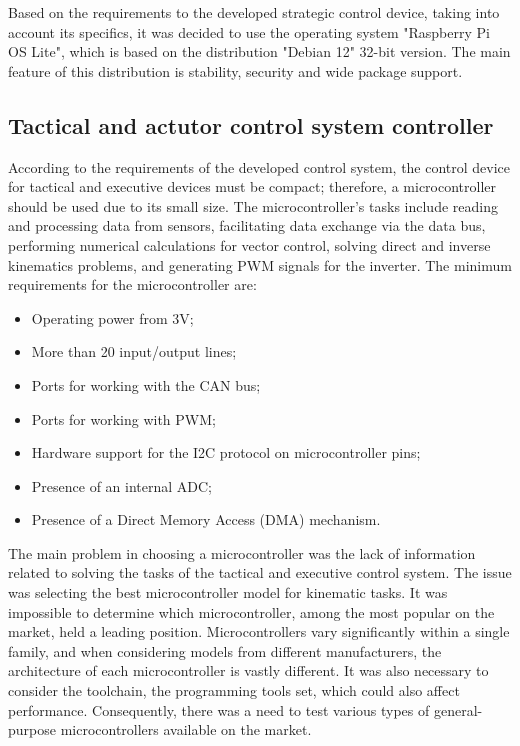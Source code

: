 Based on the requirements to the developed strategic control device, taking into account its specifics, it was decided to use the operating system "Raspberry Pi OS Lite", which is based on the distribution "Debian 12" 32-bit version. The main feature of this distribution is stability, security and wide package support.

\subsection{Tactical and actutor control system controller}

According to the requirements of the developed control system, the control device for tactical and executive devices must be compact; therefore, a microcontroller should be used due to its small size. The microcontroller's tasks include reading and processing data from sensors, facilitating data exchange via the data bus, performing numerical calculations for vector control, solving direct and inverse kinematics problems, and generating PWM signals for the inverter. The minimum requirements for the microcontroller are:
\begin{itemize}
	\item Operating power from 3V;
	\item More than 20 input/output lines;
	\item Ports for working with the CAN bus;
	\item Ports for working with PWM;
	\item Hardware support for the I2C protocol on microcontroller pins;
	\item Presence of an internal ADC;
	\item Presence of a Direct Memory Access (DMA) mechanism.
\end{itemize}

The main problem in choosing a microcontroller was the lack of information related to solving the tasks of the tactical and executive control system. The issue was selecting the best microcontroller model for kinematic tasks. It was impossible to determine which microcontroller, among the most popular on the market, held a leading position. Microcontrollers vary significantly within a single family, and when considering models from different manufacturers, the architecture of each microcontroller is vastly different. It was also necessary to consider the toolchain, the programming tools set, which could also affect performance. Consequently, there was a need to test various types of general-purpose microcontrollers available on the market.
